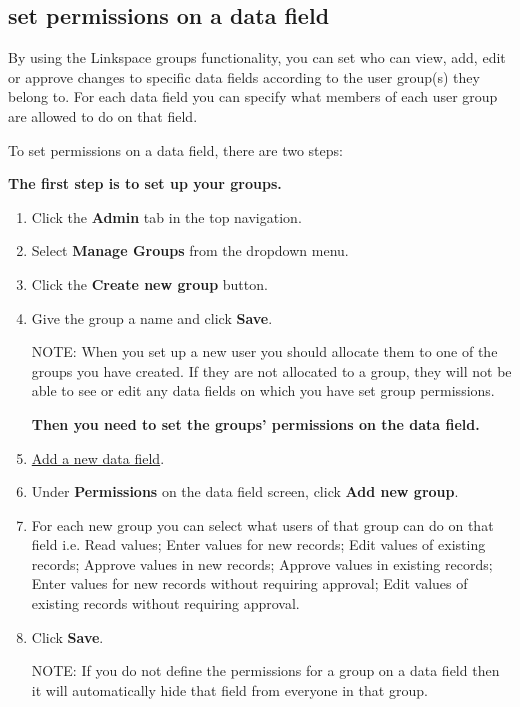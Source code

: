 \documentclass{ctrlo-int-toc}
\begin{document}
\begin{admin}
\subsection[set permissions on a data field]{set permissions on a data field}
\label{subsec:setfieldperms}
By using the Linkspace groups functionality, you can set who can view, add, edit or approve changes to specific data fields according to the user group(s) they belong to. For each data field you can specify what members of each user group are allowed to do on that field.

To set permissions on a data field, there are two steps:

\textbf{The first step is to set up your groups.}

\begin{enumerate}
    \item Click the \textbf{Admin} tab in the top navigation.
    \item Select \textbf{Manage Groups} from the dropdown menu.
    \item Click the \textbf{Create new group} button.
    \item Give the group a name and click \textbf{Save}.

\begin{notebox}
NOTE: When you set up a new user you should allocate them to one of the groups you have created. If they are not allocated to a group, they will not be able to see or edit any data fields on which you have set group permissions.
\end{notebox}

\textbf{Then you need to set the groups’ permissions on the data field.}

    \item \hyperref[subsec:addfield]{Add a new data field}.
    \item Under \textbf{Permissions} on the data field screen, click \textbf{Add new group}.
    \item For each new group you can select what users of that group can do on that field i.e. Read values; Enter values for new records; Edit values of existing records; Approve values in new records; Approve values in existing records; Enter values for new records without requiring approval; Edit values of existing records without requiring approval.
    \item Click \textbf{Save}.

\begin{notebox}
NOTE: If you do not define the permissions for a group on a data field then it will automatically hide that field from everyone in that group. 
\end{notebox}


\end{enumerate}
\end{admin}
\end{document}
